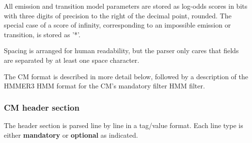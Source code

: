 All emission and transition model parameters are stored as log-odds
scores in bits with three digits of precision to the right of the
decimal point, rounded. 
The special case of a score of infinity, corresponding to an
impossible emission or transition, is stored as '*'.

Spacing is arranged for human readability, but the parser only cares
that fields are separated by at least one space character.

The CM format is described in more detail below, followed by a
description of the HMMER3 HMM format for the CM's mandatory filter HMM
filter.

\subsubsection{CM header section}

The header section is parsed line by line in a tag/value format. Each
line type is either \textbf{mandatory} or \textbf{optional} as
indicated. 


